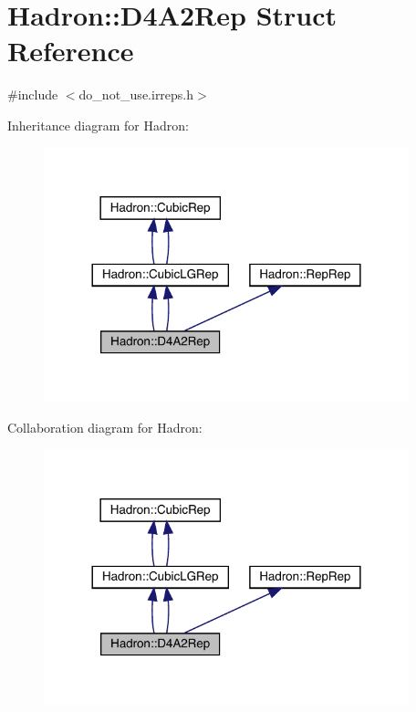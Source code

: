 \hypertarget{structHadron_1_1D4A2Rep}{}\section{Hadron\+:\+:D4\+A2\+Rep Struct Reference}
\label{structHadron_1_1D4A2Rep}


{\ttfamily \#include $<$do\+\_\+not\+\_\+use.\+irreps.\+h$>$}



Inheritance diagram for Hadron\+:\nopagebreak
\begin{figure}[H]
\begin{center}
\leavevmode
\includegraphics[width=300pt]{dd/d4b/structHadron_1_1D4A2Rep__inherit__graph}
\end{center}
\end{figure}


Collaboration diagram for Hadron\+:\nopagebreak
\begin{figure}[H]
\begin{center}
\leavevmode
\includegraphics[width=300pt]{dd/d01/structHadron_1_1D4A2Rep__coll__graph}
\end{center}
\end{figure}
